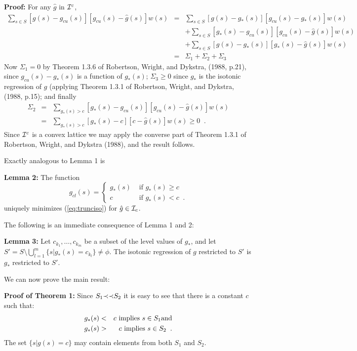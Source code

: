 {\bf Proof:} For any $\hat{g}$ in $\mbox{${\cal I}^c$}$, \begin{eqnarray*}
\sum_{s \in S} [g(s) - g_{cu}(s)][g_{cu}(s) - \hat{g}(s)
]w(s) & = & \sum_{s \in S} [g(s) - g_*(s)][g_{cu}(s) -
g_*(s)]w(s)\\
  & & + \sum_{s \in S} [g_*(s) - g_{cu}(s)][g_{cu}(s) -
					     \hat{g}(s)]w(s)\\
  & & + \sum_{s \in S} [g(s) - g_*(s)][g_*(s) -
  \hat{g}(s)]w(s)\\ & = & \Sigma_1 + \Sigma_2 + \Sigma_3
\end{eqnarray*} Now $ \Sigma_1 = 0 $ by Theorem 1.3.6 of
Robertson, Wright, and Dykstra, (1988, p.21),
since $g_{cu}(s) - g_*(s)$ is a function
of $g_*(s)$; $ \Sigma_3 \geq 0 $ since $g_*$ is the
isotonic regression of $g$ (applying Theorem 1.3.1 of
Robertson, Wright, and Dykstra, (1988, p.15);
and finally \begin{eqnarray*} \Sigma_2
& = & \sum_{g_*(s) > c} [g_*(s) - g_{cu}(s)][g_{cu}(s) -
		      \hat{g}(s)]w(s)\\
& = & \sum_{g_*(s) > c} [g_*(s) - c][c - \hat{g}(s)]w(s)
\geq 0 \;\;.  \end{eqnarray*} Since $\mbox{${\cal I}^c$}$ is a convex
lattice we may apply the converse part of Theorem 1.3.1 of
Robertson, Wright, and Dykstra (1988),
and the result follows. \qued

Exactly analogous to Lemma 1 is

{\bf Lemma 2:}  The function \begin{displaymath}
g_{cl}(s) = \left \{ \begin{array}{cl} g_*(s) & \mbox{ if }
g_*(s) \geq c\\ c & \mbox{ if } g_*(s) < c \;\;.
\end{array} \right.  \end{displaymath} uniquely minimizes
(\ref{eq:trunciso}) for $\hat{g} \in \mbox{${\cal I}_c$}$.

The following is an immediate consequence of Lemma 1 and 2:

{\bf Lemma 3:} Let $c_{k_1}, \ldots, c_{k_m}$ be a subset
of the level values of $g_*$, and let \linebreak $S' = S \setminus
\bigcup_{l=1}^m \{s | g_*(s) = c_{k_l} \} \neq \phi$.  The
isotonic regression of $g$ restricted to $S'$ is $g_*$
restricted to $S'$.

We can now prove the main result:

{\bf Proof of Theorem 1:} Since $S_1 \mbox{$\prec \prec$} S_2$ it is easy to see that
there is a constant $c$ such that:  \begin{eqnarray*}
g_*(s) & < & c \mbox{ implies } s \in S_1 {\rm and}\\
g_*(s) & > & c \mbox{ implies } s \in S_2 \;\;.
\end{eqnarray*} The set $\{s | g(s) = c \}$ may contain
elements from both $S_1$ and $S_2$.

